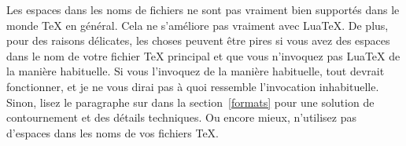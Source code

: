 \documentclass{lltxdoc}
\begin{document}
Les espaces dans les noms de fichiers ne sont pas vraiment bien supportés dans le monde TeX en général. Cela ne s'améliore pas vraiment avec LuaTeX. De plus, pour des raisons délicates, les choses peuvent être pires si vous avez des espaces dans le nom de votre fichier TeX principal et que vous n'invoquez pas LuaTeX de la manière habituelle. Si vous l'invoquez de la manière habituelle, tout devrait fonctionner, et je ne vous dirai pas à quoi ressemble l'invocation inhabituelle. Sinon, lisez le paragraphe sur  dans la section~\ref{formats} pour une solution de contournement et des détails techniques. Ou encore mieux, n'utilisez pas d'espaces dans les noms de vos fichiers TeX.
\end{document}
